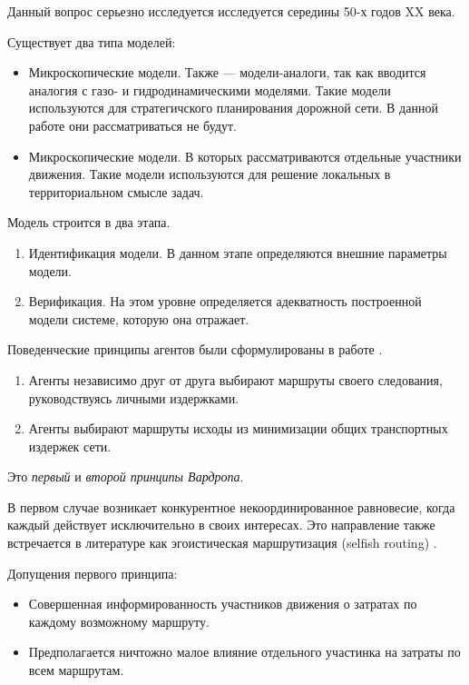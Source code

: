 Данный вопрос серьезно исследуется исследуется середины 50-х годов XX века.

Существует два типа моделей:
\begin{itemize}
	\item Микроскопические модели. Также --- модели-аналоги, так как вводится аналогия с газо- и гидродинамическими моделями. Такие модели используются для стратегичского планирования дорожной сети. В данной работе они рассматриваться не будут. 
	\item Микроскопические модели. В которых рассматриваются отдельные участники движения. Такие модели используются для решение локальных в территориальном смысле задач.
\end{itemize} \cite[225]{gas}

Модель строится в два этапа.

\begin{enumerate}
	\item Идентификация модели. В данном этапе определяются внешние параметры модели.
	\item Верификация. На этом уровне определяется адекватность построенной модели системе, которую она отражает.
\end{enumerate} \cite[225-226]{gas}

Поведенческие принципы агентов были сформулированы в работе \cite{wardrop}.



\begin{enumerate}
	\item Агенты независимо друг от друга выбирают маршруты своего следования, руководствуясь личными издержками.
	\item Агенты выбирают маршруты исходы из минимизации общих транспортных издержек сети.
\end{enumerate}

Это \textit{первый} и \textit{второй принципы Вардропа}.

В первом случае возникает конкурентное некоординированное равновесие, когда каждый действует исключительно в своих интересах. Это направление также встречается в литературе как эгоистическая маршрутизация (selfish routing) \cite[3]{rough1}.

Допущения первого принципа:
\begin{itemize}
	\item Совершенная информированность участников движения о затратах по каждому возможному маршруту.
	\item Предполагается ничтожно малое влияние отдельного участинка на затраты по всем маршрутам.
\end{itemize}


